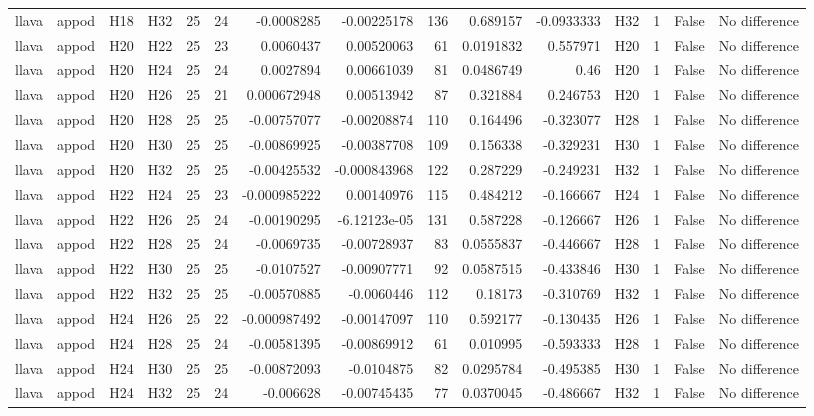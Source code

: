 \begin{longtable}{llllrrrrrrrlrrl}
llava & appod & H18 & H32 & 25 & 24 & -0.0008285 & -0.00225178 & 136 & 0.689157 & -0.0933333 & H32 & 1 & False & No difference \\
llava & appod & H20 & H22 & 25 & 23 & 0.0060437 & 0.00520063 & 61 & 0.0191832 & 0.557971 & H20 & 1 & False & No difference \\
llava & appod & H20 & H24 & 25 & 24 & 0.0027894 & 0.00661039 & 81 & 0.0486749 & 0.46 & H20 & 1 & False & No difference \\
llava & appod & H20 & H26 & 25 & 21 & 0.000672948 & 0.00513942 & 87 & 0.321884 & 0.246753 & H20 & 1 & False & No difference \\
llava & appod & H20 & H28 & 25 & 25 & -0.00757077 & -0.00208874 & 110 & 0.164496 & -0.323077 & H28 & 1 & False & No difference \\
llava & appod & H20 & H30 & 25 & 25 & -0.00869925 & -0.00387708 & 109 & 0.156338 & -0.329231 & H30 & 1 & False & No difference \\
llava & appod & H20 & H32 & 25 & 25 & -0.00425532 & -0.000843968 & 122 & 0.287229 & -0.249231 & H32 & 1 & False & No difference \\
llava & appod & H22 & H24 & 25 & 23 & -0.000985222 & 0.00140976 & 115 & 0.484212 & -0.166667 & H24 & 1 & False & No difference \\
llava & appod & H22 & H26 & 25 & 24 & -0.00190295 & -6.12123e-05 & 131 & 0.587228 & -0.126667 & H26 & 1 & False & No difference \\
llava & appod & H22 & H28 & 25 & 24 & -0.0069735 & -0.00728937 & 83 & 0.0555837 & -0.446667 & H28 & 1 & False & No difference \\
llava & appod & H22 & H30 & 25 & 25 & -0.0107527 & -0.00907771 & 92 & 0.0587515 & -0.433846 & H30 & 1 & False & No difference \\
llava & appod & H22 & H32 & 25 & 25 & -0.00570885 & -0.0060446 & 112 & 0.18173 & -0.310769 & H32 & 1 & False & No difference \\
llava & appod & H24 & H26 & 25 & 22 & -0.000987492 & -0.00147097 & 110 & 0.592177 & -0.130435 & H26 & 1 & False & No difference \\
llava & appod & H24 & H28 & 25 & 24 & -0.00581395 & -0.00869912 & 61 & 0.010995 & -0.593333 & H28 & 1 & False & No difference \\
llava & appod & H24 & H30 & 25 & 25 & -0.00872093 & -0.0104875 & 82 & 0.0295784 & -0.495385 & H30 & 1 & False & No difference \\
llava & appod & H24 & H32 & 25 & 24 & -0.006628 & -0.00745435 & 77 & 0.0370045 & -0.486667 & H32 & 1 & False & No difference \\

\end{longtable}
